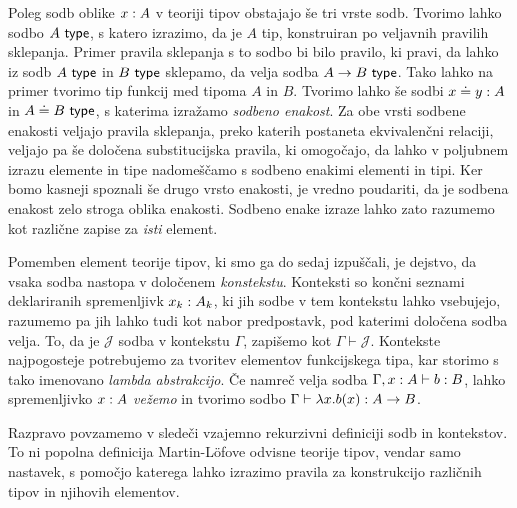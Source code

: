 Poleg sodb oblike \(x : A\) v teoriji tipov obstajajo še tri vrste sodb.
Tvorimo lahko sodbo \(A\ \textnormal{\textsf{type}}\), s katero izrazimo, da je \(A\) tip, konstruiran po veljavnih pravilih sklepanja.
Primer pravila sklepanja s to sodbo bi bilo pravilo, ki pravi, da lahko iz sodb \(A\ \textnormal{\textsf{type}}\) in \(B\ \textnormal{\textsf{type}}\) sklepamo, da velja sodba \(A \to B\ \textnormal{\textsf{type}}\). Tako lahko na primer tvorimo tip funkcij med tipoma \(A\) in \(B\).
Tvorimo lahko še sodbi \(x \doteq y : A\) in \(A \doteq B\ \textnormal{\textsf{type}}\),
s katerima izražamo \emph{sodbeno enakost}. Za obe vrsti sodbene enakosti veljajo pravila
sklepanja, preko katerih postaneta ekvivalenčni relaciji,
veljajo pa še določena substitucijska
pravila, ki omogočajo, da lahko v poljubnem izrazu elemente in tipe nadomeščamo s sodbeno
enakimi elementi in tipi. Ker bomo kasneji spoznali še drugo vrsto enakosti, je vredno
poudariti, da je sodbena enakost zelo stroga oblika enakosti. Sodbeno enake izraze lahko
zato razumemo kot različne zapise za \emph{isti} element.

Pomemben element teorije tipov, ki smo ga do sedaj izpuščali, je dejstvo,
da vsaka sodba nastopa v določenem \emph{konstekstu}. Konteksti so končni seznami
deklariranih spremenljivk \(x_k : A_{k}\), ki jih sodbe v tem kontekstu
lahko vsebujejo, razumemo pa jih lahko tudi kot nabor predpostavk, pod katerimi določena
sodba velja.  To, da je \(\mathcal{J}\) sodba v kontekstu \(\Gamma\), zapišemo kot \(\Gamma \vdash \mathcal{J}\).
Kontekste najpogosteje potrebujemo za tvoritev elementov funkcijskega tipa, kar storimo s tako imenovano \emph{lambda abstrakcijo}. Če namreč velja sodba \(\Gamma, x : A \vdash b : B\), lahko spremenljivko \(x : A\) \emph{vežemo} in tvorimo sodbo \(\Gamma \vdash \lambda x.b(x) : A \to B\).

Razpravo povzamemo v sledeči vzajemno rekurzivni definiciji sodb in kontekstov. To ni popolna definicija Martin-Löfove odvisne teorije tipov, vendar samo nastavek, s pomočjo katerega lahko izrazimo pravila za konstrukcijo različnih tipov in njihovih elementov.

